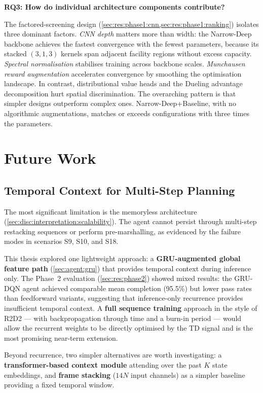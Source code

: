 \textbf{RQ3: How do individual architecture components contribute?}

The factored-screening design (\cref{sec:res:phase1:cnn,sec:res:phase1:ranking}) isolates three dominant factors. \emph{CNN depth} matters more than width: the Narrow-Deep backbone achieves the fastest convergence with the fewest parameters, because its stacked $(3,1,3)$ kernels span adjacent facility regions without excess capacity. \emph{Spectral normalisation} stabilises training across backbone scales. \emph{Munchausen reward augmentation} accelerates convergence by smoothing the optimisation landscape. In contrast, distributional value heads and the Dueling advantage decomposition hurt spatial discrimination. The overarching pattern is that simpler designs outperform complex ones. Narrow-Deep+Baseline, with no algorithmic augmentations, matches or exceeds configurations with three times the parameters.

\section{Future Work}
\label{sec:concl:future}

\subsection{Temporal Context for Multi-Step Planning}
\label{sec:concl:future:temporal}

The most significant limitation is the memoryless architecture (\cref{sec:disc:interpretation:scalability}). The agent cannot persist through multi-step restacking sequences or perform pre-marshalling, as evidenced by the failure modes in scenarios S9, S10, and S18.

This thesis explored one lightweight approach: a \textbf{GRU-augmented global feature path} (\cref{sec:agent:gru}) that provides temporal context during inference only.  The Phase~2 evaluation (\cref{sec:res:phase2}) showed mixed results: the GRU-DQN agent achieved comparable mean completion (95.5\%) but lower pass rates than feedforward variants, suggesting that inference-only recurrence provides insufficient temporal context.  A \textbf{full sequence training} approach in the style of R2D2 \cite{kapturowski2019r2d2} --- with backpropagation through time and a burn-in period --- would allow the recurrent weights to be directly optimised by the TD signal and is the most promising near-term extension.

Beyond recurrence, two simpler alternatives are worth investigating: a \textbf{transformer-based context module} attending over the past $K$ state embeddings, and \textbf{frame stacking} ($14N$ input channels) as a simpler baseline providing a fixed temporal window.

